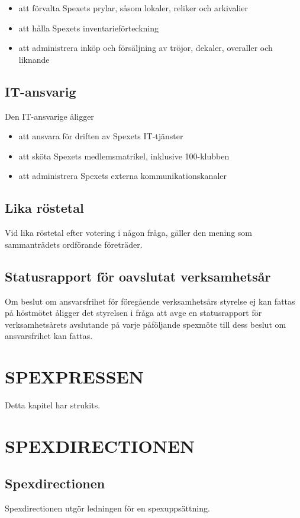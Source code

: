 \documentclass[a4paper]{article}
\begin{document}
\begin{itemize}
  \item att förvalta Spexets prylar, såsom lokaler, reliker och arkivalier
  \item att hålla Spexets inventarieförteckning
  \item att administrera inköp och försäljning av tröjor, dekaler, overaller och liknande
\end{itemize}

\subsection{IT-ansvarig}
Den IT-ansvarige åligger

\begin{itemize}
  \item att ansvara för driften av Spexets IT-tjänster
  \item att sköta Spexets medlemsmatrikel, inklusive 100-klubben
  \item att administrera Spexets externa kommunikationskanaler
\end{itemize}

\subsection{Lika röstetal}
Vid lika röstetal efter votering i någon fråga, gäller den mening som sammanträdets ordförande företräder.

\subsection{Statusrapport för oavslutat verksamhetsår}
Om beslut om ansvarsfrihet för föregående verksamhetsårs styrelse ej kan fattas på höstmötet åligger det styrelsen i fråga att avge en statusrapport för verksamhetsårets avslutande på varje påföljande spexmöte till dess beslut om ansvarsfrihet kan fattas.

\section{SPEXPRESSEN}
\label{section:spexpressen}
Detta kapitel har strukits.

\section{SPEXDIRECTIONEN}
\label{section:spexdirectionen}

\subsection{Spexdirectionen}
Spexdirectionen utgör ledningen för en spexuppsättning.
\end{document}

